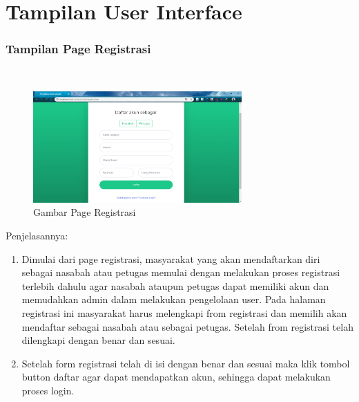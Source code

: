 \section{Tampilan User Interface}
\subsubsection{Tampilan Page Registrasi}
\hfill\\
	\begin{figure}[H]
		\includegraphics[width=8cm]{figures/analisis/18.png}
		\centering
		\caption{Gambar Page Registrasi}
	\end{figure}
Penjelasannya:
\begin{enumerate}
\item Dimulai dari page registrasi, masyarakat yang akan mendaftarkan diri sebagai nasabah atau petugas memulai dengan melakukan proses registrasi terlebih dahulu agar nasabah ataupun petugas dapat memiliki akun dan memudahkan admin dalam melakukan pengelolaan user. Pada halaman registrasi ini masyarakat harus melengkapi from registrasi dan memilih akan mendaftar sebagai nasabah atau sebagai petugas. Setelah from registrasi telah dilengkapi dengan  benar dan sesuai. 
\item Setelah form registrasi telah di isi dengan benar dan sesuai maka klik tombol button daftar agar dapat mendapatkan akun, sehingga dapat melakukan proses login.
\end{enumerate}

